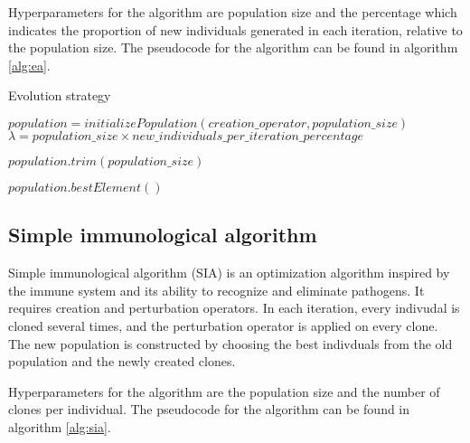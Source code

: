 Hyperparameters for the algorithm are population size and the percentage which indicates the proportion of new individuals generated in each iteration, relative to the population size. The pseudocode for the algorithm can be found in algorithm \ref{alg:ea}.

\begin{algorithm}[!htbp]
    \caption{Evolution strategy}
    \label{alg:ea}

    $population = initializePopulation(creation\_operator, population\_size)$\;
    $\lambda = population\_size \times new\_individuals\_per\_iteration\_percentage$\;

     {
        $population.trim(population\_size)$\;
    }

    \Return $population.bestElement()$\;
    \end{algorithm}

\subsection{Simple immunological algorithm}
\label{sec:sia}

Simple immunological algorithm (SIA) \citep{sia} is an optimization algorithm inspired by the immune system and its ability to recognize and eliminate pathogens. It requires creation and perturbation operators. In each iteration, every indivudal is cloned several times, and the perturbation operator is applied on every clone. The new population is constructed by choosing the best indivduals from the old population and the newly created clones.

Hyperparameters for the algorithm are the population size and the number of clones per individual. The pseudocode for the algorithm can be found in algorithm \ref{alg:sia}.

